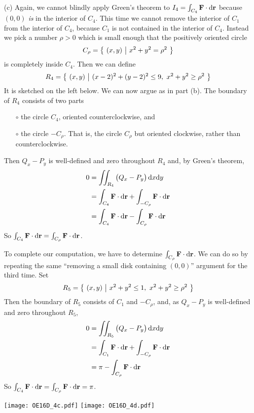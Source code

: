\begin{solution}
(c) Again, we cannot blindly apply Green's theorem 
to $I_4=\int_{C_4}\mathbf{F}\cdot\mathrm{d}\mathbf{r}$
because $(0,0)$ \emph{is} in the interior of $C_4$. This time
we cannot remove the interior of $C_1$ from the interior of $C_4$,
because $C_1$ is not contained in the interior of $C_4$. Instead
we pick a number $\rho>0$ which is small enough that the
positively oriented circle 
\begin{equation*}
C_\rho = \big\{ \ (x,y)\ \big|\ x^2+y^2=\rho^2\ \big\}
\end{equation*}
is completely inside $C_4$. Then we can define
\begin{equation*}
R_4 = \big\{ \ (x,y)\ \big|\ (x-2)^2 + (y - 2)^2 \le 9,\ x^2+y^2\ge \rho^2\ \big\}
\end{equation*}
It is sketched on the left below. We can now argue as in part (b).
The boundary of $R_4$ consists of two parts
\begin{itemize}\itemsep1pt \parskip0pt  %
\item[$\circ$]
the circle $C_4$, oriented counterclockwise, and
\item[$\circ$]
the circle $-C_\rho$. That is, the circle $C_\rho$ but oriented clockwise,
rather than counterclockwise.
\end{itemize}
Then $Q_x-P_y$ is well-defined and zero throughout $R_4$ and,
by Green's theorem,
\begin{align*}
   0 &=\iint_{R_4} \big(Q_x-P_y\big)\,\mathrm{d}x\mathrm{d}y \\
    &= \int_{C_4} \mathbf{F}\cdot\mathrm{d}\mathbf{r} 
             + \int_{-C_\rho} \mathbf{F}\cdot\mathrm{d}\mathbf{r} \\
    &= \int_{C_4} \mathbf{F}\cdot\mathrm{d}\mathbf{r} 
             - \int_{C_\rho} \mathbf{F}\cdot\mathrm{d}\mathbf{r} 
\end{align*}
So $\int_{C_4} \mathbf{F}\cdot\mathrm{d}\mathbf{r} = \int_{C_\rho} \mathbf{F}\cdot\mathrm{d}\mathbf{r}$.

To complete our computation, we have to determine 
$\int_{C_\rho} \mathbf{F}\cdot\mathrm{d}\mathbf{r}$. We can do so by repeating the
same ``removing a small disk containing $(0,0)$'' argument for the third time.
Set
\begin{equation*}
R_5 = \big\{ \ (x,y)\ \big|\ x^2 + y^2 \le 1,\ x^2+y^2\ge \rho^2\ \big\}
\end{equation*}
Then the boundary of $R_5$ consists of $C_1$ and $-C_\rho$,
and, as $Q_x-P_y$ is well-defined and zero throughout $R_5$,
\begin{align*}
   0 &=\iint_{R_5} \big(Q_x-P_y\big)\,\mathrm{d}x\mathrm{d}y \\
    &= \int_{C_1} \mathbf{F}\cdot\mathrm{d}\mathbf{r} 
             + \int_{-C_\rho} \mathbf{F}\cdot\mathrm{d}\mathbf{r} \\
    &= \pi
             - \int_{C_\rho} \mathbf{F}\cdot\mathrm{d}\mathbf{r} 
\end{align*}
So $\int_{C_4} \mathbf{F}\cdot\mathrm{d}\mathbf{r} = \int_{C_\rho} \mathbf{F}\cdot\mathrm{d}\mathbf{r}=\pi$.

\begin{center}
     \texttt{[image: OE16D\_4c.pdf]}\qquad
     \texttt{[image: OE16D\_4d.pdf]}
\end{center}
\end{solution}

